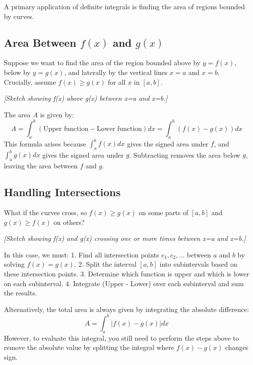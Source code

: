 \documentclass[11pt]{article}
\theoremstyle{definition}
\theoremstyle{remark} %
\begin{document}
A primary application of definite integrals is finding the area of regions bounded by curves.

\subsection{Area Between $f(x)$ and $g(x)$}

Suppose we want to find the area of the region bounded above by $y=f(x)$, below by $y=g(x)$, and laterally by the vertical lines $x=a$ and $x=b$. Crucially, assume $f(x) \ge g(x)$ for all $x$ in $[a, b]$.

\begin{center}
\textit{[Sketch showing f(x) above g(x) between x=a and x=b.]}
\end{center}

The area $A$ is given by:
\[
A = \int_a^b (\text{Upper function} - \text{Lower function}) dx = \int_a^b (f(x) - g(x)) dx
\]
This formula arises because $\int_a^b f(x) dx$ gives the signed area under $f$, and $\int_a^b g(x) dx$ gives the signed area under $g$. Subtracting removes the area below $g$, leaving the area between $f$ and $g$.

\subsection{Handling Intersections}

What if the curves cross, so $f(x) \ge g(x)$ on some parts of $[a, b]$ and $g(x) \ge f(x)$ on others?

\begin{center}
\textit{[Sketch showing f(x) and g(x) crossing one or more times between x=a and x=b.]}
\end{center}

In this case, we must:
1.  Find all intersection points $c_1, c_2, \dots$ between $a$ and $b$ by solving $f(x) = g(x)$.
2.  Split the interval $[a, b]$ into subintervals based on these intersection points.
3.  Determine which function is upper and which is lower on each subinterval.
4.  Integrate (Upper - Lower) over each subinterval and sum the results.

Alternatively, the total area is always given by integrating the absolute difference:
\[
A = \int_a^b |f(x) - g(x)| dx
\]
However, to evaluate this integral, you still need to perform the steps above to remove the absolute value by splitting the integral where $f(x)-g(x)$ changes sign.
\end{document}
